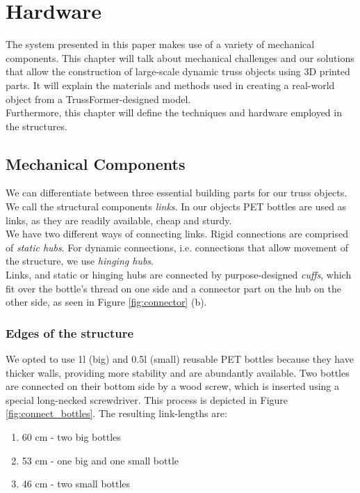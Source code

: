 \chapter{Hardware}\label{ch:hardware}
The system presented in this paper makes use of a variety of mechanical components. This chapter will talk about mechanical challenges and our solutions that allow the construction of large-scale dynamic truss objects using 3D printed parts. It will explain the materials and methods used in creating a real-world object from a TrussFormer-designed model.\\
Furthermore, this chapter will define the techniques and hardware employed in the structures.

\section{Mechanical Components}
We can differentiate between three essential building parts for our truss objects. We call the structural components \textit{links}. In our objects PET bottles are used as links, as they are readily available, cheap and sturdy.\\
We have two different ways of connecting links. Rigid connections are comprised of \textit{static hubs}. For dynamic connections, i.e. connections that allow movement of the structure, we use \textit{hinging hubs}.\\
Links, and static or hinging hubs are connected by purpose-designed \textit{cuffs}, which fit over the bottle's thread on one side and a connector part on the hub on the other side, as seen in Figure \ref{fig:connector} (b).

\subsection{Edges of the structure}
We opted to use 1l (big) and 0.5l (small) reusable PET bottles because they have thicker walls, providing more stability and are abundantly available. Two bottles are connected on their bottom side by a wood screw, which is inserted using a special long-necked screwdriver. This process is depicted in Figure \ref{fig:connect_bottles}. The resulting link-lengths are:
\begin{enumerate}
\item 60 cm - two big bottles
\item 53 cm - one big and one small bottle
\item 46 cm - two small bottles
\end{enumerate}

